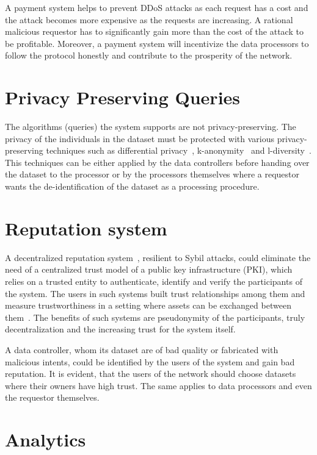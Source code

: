 A payment system helps to prevent DDoS attacks as each request has a cost and the attack becomes more expensive as the requests are increasing. A rational malicious requestor has to significantly gain more than the cost of the attack to be profitable. Moreover, a payment system will incentivize the data processors to follow the protocol honestly and contribute to the prosperity of the network.

\section{Privacy Preserving Queries}
\label{future_work:ppq}

The algorithms (queries) the system supports are not privacy-preserving. The privacy of the individuals in the dataset must be protected with various privacy-preserving techniques such as differential privacy~\cite{differential_privacy}, k-anonymity~\cite{Samarati98protectingprivacy} and l-diversity~\cite{Aggarwal2008}. This techniques can be either applied by the data controllers before handing over the dataset to the processor or by the processors themselves where a requestor wants the de-identification of the dataset as a processing procedure.

\section{Reputation system}
\label{future_work:ranking_system}

A decentralized reputation system~\cite{trust_is_risk}, resilient to Sybil attacks, could eliminate the need of a centralized trust model of a public key infrastructure (PKI), which relies on a trusted entity to authenticate, identify and verify the participants of the system. The users in such systems built trust relationships among them and measure trustworthiness in a setting where assets can be exchanged between them~\cite{trust_is_risk}. The benefits of such systems are pseudonymity of the participants, truly decentralization and the increasing trust for the system itself.

A data controller, whom its dataset are of bad quality or fabricated with malicious intents, could be identified by the users of the system and gain bad reputation. It is evident, that the users of the network should choose datasets where their owners have high trust. The same applies to data processors and even the requestor themselves.

\section{Analytics}
\label{future_work:analytics}

